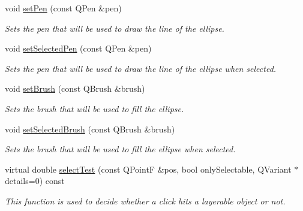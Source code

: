 \begin{DoxyCompactItemize}
\item 
void \hyperlink{classQCPItemEllipse_adb81a663ed2420fcfa011e49f678d1a6}{set\+Pen} (const Q\+Pen \&pen)
\begin{DoxyCompactList}\small\item\em Sets the pen that will be used to draw the line of the ellipse. \end{DoxyCompactList}\item 
void \hyperlink{classQCPItemEllipse_a6c542fba1dc918041c583f58a50dde99}{set\+Selected\+Pen} (const Q\+Pen \&pen)
\begin{DoxyCompactList}\small\item\em Sets the pen that will be used to draw the line of the ellipse when selected. \end{DoxyCompactList}\item 
void \hyperlink{classQCPItemEllipse_a49fc74e6965834e873d027d026def798}{set\+Brush} (const Q\+Brush \&brush)
\begin{DoxyCompactList}\small\item\em Sets the brush that will be used to fill the ellipse. \end{DoxyCompactList}\item 
void \hyperlink{classQCPItemEllipse_a9693501cfaa43a099655c75bed0dab3f}{set\+Selected\+Brush} (const Q\+Brush \&brush)
\begin{DoxyCompactList}\small\item\em Sets the brush that will be used to fill the ellipse when selected. \end{DoxyCompactList}\item 
virtual double \hyperlink{classQCPItemEllipse_acd7e5f9528630b2ab5987e2a5782eb7c}{select\+Test} (const Q\+Point\+F \&pos, bool only\+Selectable, Q\+Variant $\ast$details=0) const 
\begin{DoxyCompactList}\small\item\em This function is used to decide whether a click hits a layerable object or not. \end{DoxyCompactList}\end{DoxyCompactItemize}
